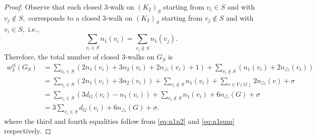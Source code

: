 \documentclass[10pt,a4paper]{amsart}
\begin{document}
\begin{proof}
Observe that each closed 3-walk on $(K_2)_S$ starting from $v_i \in S$ and with $v_j \notin S,$ corresponds to a closed 3-walk on $(K_2)_S$ starting from $v_j \notin S$ and with $v_i \in S,$ i.e.,
\begin{equation}
\label{eq:n1sum}
\sum_{v_i \in S} n_1(v_i) = \sum_{v_j \notin S} n_1(v_j).
\end{equation}
Therefore, the total number of closed 3-walks on $G_S$ is 
\begin{align*}
w_3^{cl}(G_S)
&= \sum_{v_i \in S} \left(2 n_1(v_i) + 3n_2(v_i) + 2n_\triangle(v_i) +1 \right) + 
\sum_{v_i \notin S} \left( n_1(v_i) + 2n_\triangle(v_i) \right) \\
&= \sum_{v_i \in S} \left(2 n_1(v_i) + 3n_2(v_i)\right) + \sum_{v_i \notin S} n_1(v_i) + \sum_{v \in V(G)} 2n_\triangle(v) + \sigma \\
&=\sum_{v_i \in S} \left(3 d_G(v_i) - n_1(v_i) \right) + \sum_{v_i \notin S} n_1(v_i) + 6 n_\triangle(G) + \sigma \\
&= 3\sum_{v_i \in S} d_G(v_i) + 6 n_\triangle(G) + \sigma. 
\end{align*}
where the third and fourth equalities follow from \eqref{eq:n1n2} and \eqref{eq:n1sum} respectively.
\end{proof}
\end{document}
